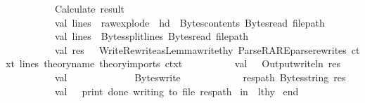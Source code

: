 \begin{isabellebody}
\isanewline
\ \ \ \ \ \ \ \ \ \ {\isacharparenleft}{\kern0pt}{\isacharasterisk}{\kern0pt}Calculate\ result{\isacharasterisk}{\kern0pt}{\isacharparenright}{\kern0pt}\isanewline
\ \ \ \ \ \ \ \ \ \ {\isacharparenleft}{\kern0pt}{\isacharasterisk}{\kern0pt}val\ lines\ {\isacharequal}{\kern0pt}\ raw{\isacharunderscore}{\kern0pt}explode\ {\isacharparenleft}{\kern0pt}\ hd\ \ {\isacharparenleft}{\kern0pt}Bytes{\isachardot}{\kern0pt}contents\ {\isacharparenleft}{\kern0pt}Bytes{\isachardot}{\kern0pt}read\ file{\isacharunderscore}{\kern0pt}path{\isacharparenright}{\kern0pt}{\isacharparenright}{\kern0pt}{\isacharparenright}{\kern0pt}\ {\isacharsemicolon}{\kern0pt}{\isacharasterisk}{\kern0pt}{\isacharparenright}{\kern0pt}\isanewline
\ \ \ \ \ \ \ \ \ \ val\ lines\ {\isacharequal}{\kern0pt}\ Bytes{\isachardot}{\kern0pt}split{\isacharunderscore}{\kern0pt}lines\ {\isacharparenleft}{\kern0pt}Bytes{\isachardot}{\kern0pt}read\ file{\isacharunderscore}{\kern0pt}path{\isacharparenright}{\kern0pt}\isanewline
\ \ \ \ \ \ \ \ \ \ val\ res\ {\isacharequal}{\kern0pt}\ \ {\isacharparenleft}{\kern0pt}Write{\isacharunderscore}{\kern0pt}Rewrite{\isacharunderscore}{\kern0pt}as{\isacharunderscore}{\kern0pt}Lemma{\isachardot}{\kern0pt}write{\isacharunderscore}{\kern0pt}thy\ {\isacharparenleft}{\kern0pt}Parse{\isacharunderscore}{\kern0pt}RARE{\isachardot}{\kern0pt}parse{\isacharunderscore}{\kern0pt}rewrites\ ctxt\ lines{\isacharparenright}{\kern0pt}\ theory{\isacharunderscore}{\kern0pt}name\ theory{\isacharunderscore}{\kern0pt}imports\ ctxt{\isacharparenright}{\kern0pt}\isanewline
\ \ \ \ \ \ \ \ \ \ val\ {\isacharunderscore}{\kern0pt}\ {\isacharequal}{\kern0pt}\ {\isacharparenleft}{\kern0pt}Output{\isachardot}{\kern0pt}writeln\ res{\isacharparenright}{\kern0pt}\isanewline
\isanewline
\ \ \ \ \ \ \ \ \ \ val\ {\isacharunderscore}{\kern0pt}\ {\isacharequal}{\kern0pt}\isanewline
\ \ \ \ \ \ \ \ \ \ \ Bytes{\isachardot}{\kern0pt}write\isanewline
\ \ \ \ \ \ \ \ \ \ \ \ res{\isacharunderscore}{\kern0pt}path\ {\isacharparenleft}{\kern0pt}Bytes{\isachardot}{\kern0pt}string\ res{\isacharparenright}{\kern0pt}\isanewline
\ \ \ \ \ \ \ \ \ \ val\ {\isacharunderscore}{\kern0pt}\ {\isacharequal}{\kern0pt}\ {\isacharat}{\kern0pt}{\isacharbraceleft}{\kern0pt}print{\isacharbraceright}{\kern0pt}\ {\isacharparenleft}{\kern0pt}{\isachardoublequote}{\kern0pt}done\ writing\ to\ file{\isachardoublequote}{\kern0pt}{\isacharcomma}{\kern0pt}\ res{\isacharunderscore}{\kern0pt}path{\isacharparenright}{\kern0pt}\isanewline
\ in\ \ lthy\isanewline
\ end{\isacharparenright}{\kern0pt}{\isacharparenright}{\kern0pt}\isanewline

\end{isabellebody}
